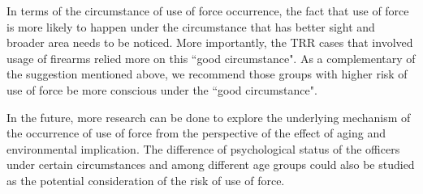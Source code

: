 \documentclass[10pt]{article}
\begin{document}
In terms of the circumstance of use of force occurrence, the fact that use of force is more likely to happen under the circumstance that has better sight and broader area needs to be noticed. More importantly, the TRR cases that involved usage of firearms relied more on this ``good circumstance". As a complementary of the suggestion mentioned above, we recommend those groups with higher risk of use of force be more conscious under the ``good circumstance".

In the future, more research can be done to explore the underlying mechanism of the occurrence of use of force from the perspective of the effect of aging and environmental implication. The difference of psychological status of the officers under certain circumstances and among different age groups could also be studied as the potential consideration of the risk of use of force.
\end{document}
